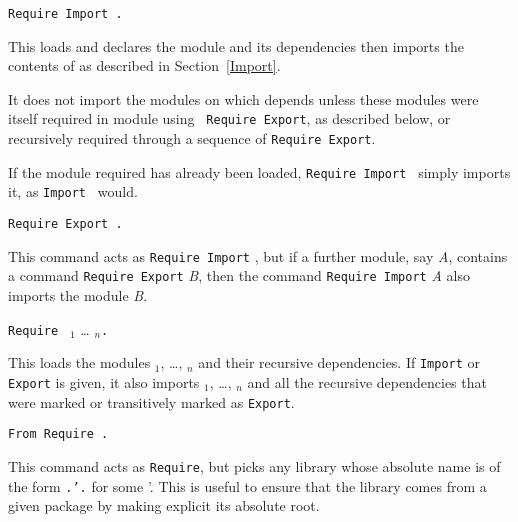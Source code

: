 \begin{Variants}
\item {\tt Require Import {\qualid}.} 

  This loads and declares the module {\qualid} and its dependencies
  then imports the contents of {\qualid} as described in
  Section~\ref{Import}.

  It does not import the modules on which {\qualid} depends unless
  these modules were itself required in module {\qualid} using {\tt
  Require Export}, as described below, or recursively required through
  a sequence of {\tt Require Export}.

  If the module required has already been loaded, {\tt Require Import
  {\qualid}} simply imports it, as {\tt Import {\qualid}} would.

\item {\tt Require Export {\qualid}.}

  This command acts as {\tt Require Import} {\qualid}, but if a
  further module, say {\it A}, contains a command {\tt Require
  Export} {\it B}, then the command {\tt Require Import} {\it A}
  also imports the module {\it B}.

\item {\tt Require } {\qualid}$_1$ {\ldots} {\qualid}$_n${\tt .}

  This loads the modules {\qualid}$_1$, \ldots, {\qualid}$_n$ and
  their recursive dependencies. If {\tt Import} or {\tt Export} is
  given, it also imports {\qualid}$_1$, \ldots, {\qualid}$_n$ and all
  the recursive dependencies that were marked or transitively marked
  as {\tt Export}.

\item {\tt From {\dirpath} Require {\qualid}.}

  This command acts as {\tt Require}, but picks any library whose absolute name
  is of the form {\tt{\dirpath}.{\dirpath'}.{\qualid}} for some {\dirpath'}.
  This is useful to ensure that the {\qualid} library comes from a given
  package by making explicit its absolute root.

\end{Variants}

